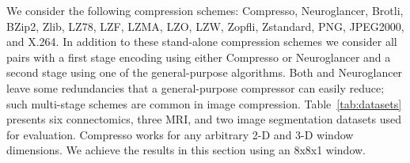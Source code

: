 
We consider the following compression schemes: Compresso, Neuroglancer, Brotli, BZip2, Zlib, LZ78, LZF, LZMA, LZO, LZW, Zopfli, Zstandard, PNG, JPEG2000, and X.264. 
In addition to these stand-alone compression schemes we consider all pairs with a first stage encoding using either Compresso or Neuroglancer and a second stage using one of the general-purpose algorithms. 
Both \appName and Neuroglancer leave some redundancies that a general-purpose compressor can easily reduce; such multi-stage schemes are common in image compression. 
Table~\ref{tab:datasets} presents six connectomics, three MRI, and two image segmentation datasets used for evaluation. 
Compresso works for any arbitrary 2-D and 3-D window dimensions. We achieve the results in this section using an 8x8x1 window.


